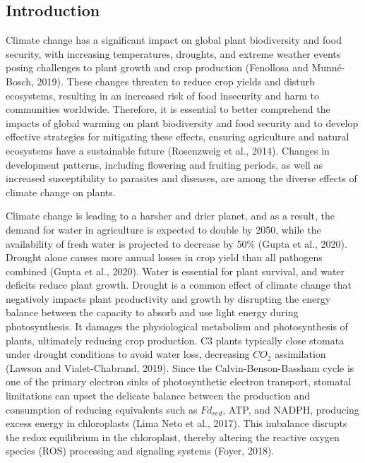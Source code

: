 \documentclass[
  12pt,
  letterpaper,
  DIV=11,
  numbers=noendperiod]{scrartcl}
\begin{document}
\hypertarget{introduction}{%
\subsection{Introduction}\label{introduction}}

Climate change has a significant impact on global plant biodiversity and
food security, with increasing temperatures, droughts, and extreme
weather events posing challenges to plant growth and crop production
(Fenollosa and Munné-Bosch, 2019). These changes threaten to reduce crop
yields and disturb ecosystems, resulting in an increased risk of food
insecurity and harm to communities worldwide. Therefore, it is essential
to better comprehend the impacts of global warming on plant biodiversity
and food security and to develop effective strategies for mitigating
these effects, ensuring agriculture and natural ecosystems have a
sustainable future (Rosenzweig et al., 2014). Changes in development
patterns, including flowering and fruiting periods, as well as increased
susceptibility to parasites and diseases, are among the diverse effects
of climate change on plants.

Climate change is leading to a harsher and drier planet, and as a
result, the demand for water in agriculture is expected to double by
2050, while the availability of fresh water is projected to decrease by
50\% (Gupta et al., 2020). Drought alone causes more annual losses in
crop yield than all pathogens combined (Gupta et al., 2020). Water is
essential for plant survival, and water deficits reduce plant growth.
Drought is a common effect of climate change that negatively impacts
plant productivity and growth by disrupting the energy balance between
the capacity to absorb and use light energy during photosynthesis. It
damages the physiological metabolism and photosynthesis of plants,
ultimately reducing crop production. C3 plants typically close stomata
under drought conditions to avoid water loss, decreasing \(CO_2\)
assimilation (Lawson and Vialet-Chabrand, 2019). Since the
Calvin-Benson-Bassham cycle is one of the primary electron sinks of
photosynthetic electron transport, stomatal limitations can upset the
delicate balance between the production and consumption of reducing
equivalents such as \(Fd_{red}\), ATP, and NADPH, producing excess
energy in chloroplasts (Lima Neto et al., 2017). This imbalance disrupts
the redox equilibrium in the chloroplast, thereby altering the reactive
oxygen species (ROS) processing and signaling systems (Foyer, 2018).
\end{document}
